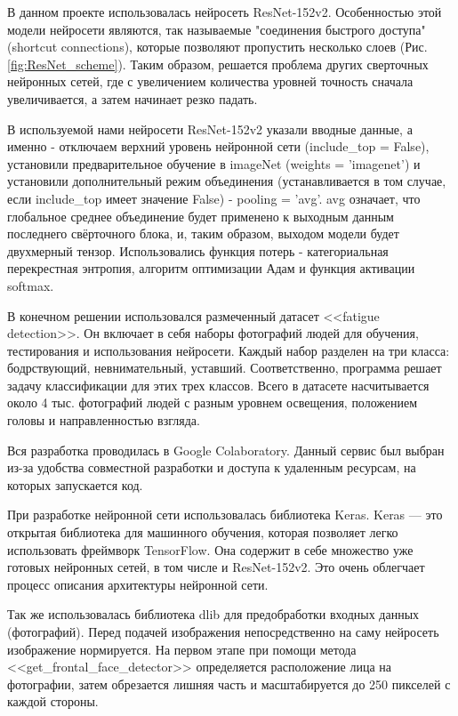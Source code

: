 \documentclass[12pt, letterpaper]{article}
\begin{document}
    В данном проекте использовалась нейросеть ResNet-152v2\cite{he_deep_2015}. Особенностью этой модели нейросети являются, так называемые "соединения быстрого доступа" (shortcut connections), которые позволяют пропустить несколько слоев (Рис. \ref{fig:ResNet_scheme}). Таким образом, решается проблема других сверточных нейронных сетей, где с увеличением количества уровней точность сначала увеличивается, а затем начинает резко падать.
    
    В используемой нами нейросети ResNet-152v2 указали вводные данные, а именно - отключаем верхний уровень нейронной сети (include\_top = False), установили предварительное обучение в imageNet (weights = 'imagenet') и установили дополнительный режим объединения (устанавливается в том случае, если include\_top имеет значение False) - pooling = 'avg'. 
    avg означает, что глобальное среднее объединение будет применено к выходным данным последнего свёрточного блока, и, таким образом, выходом модели будет двухмерный тензор.
    Использовались функция потерь - категориальная перекрестная энтропия, алгоритм оптимизации Адам и функция активации softmax.
    
    В конечном решении использовался размеченный датасет <<fatigue detection>>\cite{noauthor_fatigue_detection_nodate}. Он включает в себя наборы фотографий людей для обучения, тестирования и использования нейросети. Каждый набор разделен на три класса: бодрствующий, невнимательный, уставший. Соответственно, программа решает задачу классификации для этих трех классов. Всего в датасете насчитывается около 4 тыс. фотографий людей с разным уровнем освещения, положением головы и направленностью взгляда.
    
    Вся разработка проводилась в Google Colaboratory\cite{noauthor_colaboratory_nodate}. Данный сервис был выбран из-за удобства совместной разработки и доступа к удаленным ресурсам, на которых запускается код.
    
    При разработке нейронной сети использовалась библиотека Keras\cite{noauthor_keras_nodate}. Keras — это открытая библиотека для машинного обучения, которая позволяет легко использовать фреймворк TensorFlow\cite{noauthor_tensorflow_nodate}. Она содержит в себе множество уже готовых нейронных сетей, в том числе и ResNet-152v2. Это очень облегчает процесс описания архитектуры нейронной сети.
    
    Так же использовалась библиотека dlib для предобработки входных данных (фотографий).
    Перед подачей изображения непосредственно на саму нейросеть изображение нормируется. На первом этапе при помощи метода <<get\_frontal\_face\_detector>> определяется расположение лица на фотографии, затем обрезается лишняя часть и масштабируется до 250 пикселей с каждой стороны.
    
\end{document}
